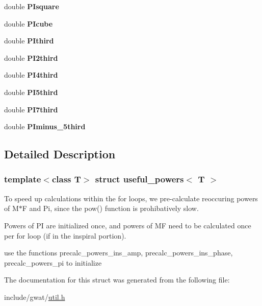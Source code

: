 \begin{DoxyCompactItemize}
\item 
\mbox{\label{structuseful__powers_a17019be1f43fc88a0a8906c0b0c86179}} 
double {\bfseries P\+Isquare}
\item 
\mbox{\label{structuseful__powers_abf93d647fb55848266bfa179a6118c22}} 
double {\bfseries P\+Icube}
\item 
\mbox{\label{structuseful__powers_a4b48e36e3acf84d91a81fe1cc8d9a7a7}} 
double {\bfseries P\+Ithird}
\item 
\mbox{\label{structuseful__powers_acb8ebe3afa5700faabee08772532f11e}} 
double {\bfseries P\+I2third}
\item 
\mbox{\label{structuseful__powers_ab980b3eea9af1225b75450837c6da7ab}} 
double {\bfseries P\+I4third}
\item 
\mbox{\label{structuseful__powers_a844f8ca2f137bdd2bd51bcacb8a11fd0}} 
double {\bfseries P\+I5third}
\item 
\mbox{\label{structuseful__powers_a398b4320fabb77a71a6cfb942ccf4fb8}} 
double {\bfseries P\+I7third}
\item 
\mbox{\label{structuseful__powers_a4053c92711daa53f53a1e46d239cf19e}} 
double {\bfseries P\+Iminus\+\_\+5third}
\end{DoxyCompactItemize}


\subsection{Detailed Description}
\subsubsection*{template$<$class T$>$\newline
struct useful\+\_\+powers$<$ T $>$}

To speed up calculations within the for loops, we pre-\/calculate reoccuring powers of M$\ast$F and Pi, since the pow() function is prohibatively slow. 

Powers of PI are initialized once, and powers of MF need to be calculated once per for loop (if in the inspiral portion).

use the functions precalc\+\_\+powers\+\_\+ins\+\_\+amp, precalc\+\_\+powers\+\_\+ins\+\_\+phase, precalc\+\_\+powers\+\_\+pi to initialize 

The documentation for this struct was generated from the following file\+:\begin{DoxyCompactItemize}
\item 
include/gwat/\hyperlink{util_8h}{util.\+h}\end{DoxyCompactItemize}
